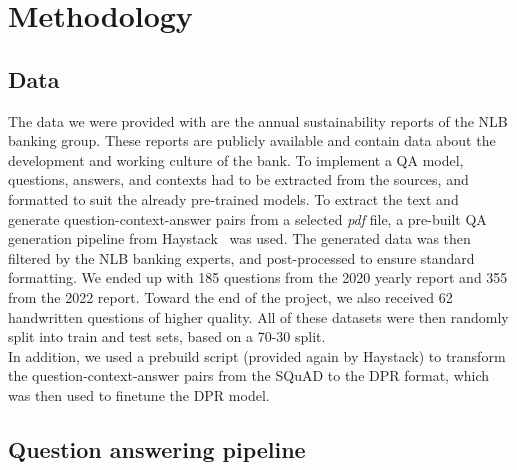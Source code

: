 \documentclass[fleqn,moreauthors,10pt]{ds_report}
\begin{document}
\section*{Methodology}
\subsection*{Data}
The data we were provided with are the annual sustainability reports of the NLB banking group.
These reports are publicly available and contain data about the development and working culture of the bank.
To implement a QA model, questions, answers, and contexts had to be extracted from the sources, and formatted to suit the already pre-trained models.
To extract the text and generate question-context-answer pairs from a selected \textit{pdf} file, a pre-built QA generation pipeline from Haystack~\cite{haystack} was used.
The generated data was then filtered by the NLB banking experts, and post-processed to ensure standard formatting.
We ended up with 185 questions from the 2020 yearly report and 355 from the 2022 report.
Toward the end of the project, we also received 62 handwritten questions of higher quality.
All of these datasets were then randomly split into train and test sets, based on a 70-30 split. \\
In addition, we used a prebuild script (provided again by Haystack) to transform the question-context-answer pairs from the SQuAD to the DPR format, which was then used to finetune the DPR model.

\subsection*{Question answering pipeline}
\end{document}
